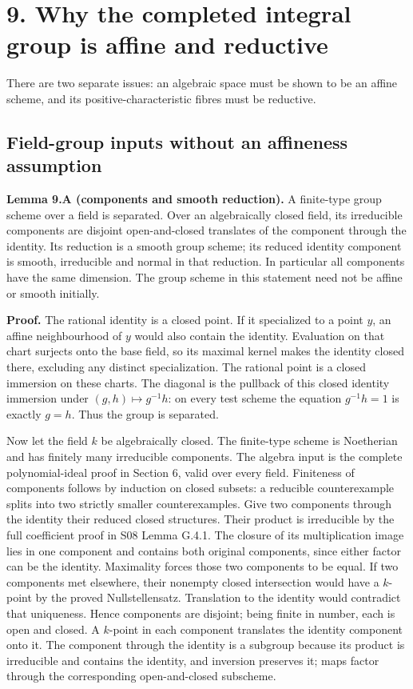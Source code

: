 \documentclass[11pt,a4paper,openany]{report}
\newcounter{none}
\begin{document}
\section{9. Why the completed integral group is affine and reductive}\label{AG-RG-05-why-the-completed-integral-group-is-affine-and-reductive}

There are two separate issues: an algebraic space must be shown to be an affine scheme, and its positive-characteristic fibres must be reductive.

\subsection{Field-group inputs without an affineness assumption}\label{AG-RG-05-field-group-inputs-without-an-affineness-assumption}

\textbf{Lemma 9.A (components and smooth reduction).} A finite-type group scheme over a field is separated. Over an algebraically closed field, its irreducible components are disjoint open-and-closed translates of the component through the identity. Its reduction is a smooth group scheme; its reduced identity component is smooth, irreducible and normal in that reduction. In particular all components have the same dimension. The group scheme in this statement need not be affine or smooth initially.

\textbf{Proof.} The rational identity is a closed point. If it specialized to a point \(y\), an affine neighbourhood of \(y\) would also contain the identity. Evaluation on that chart surjects onto the base field, so its maximal kernel makes the identity closed there, excluding any distinct specialization. The rational point is a closed immersion on these charts. The diagonal is the pullback of this closed identity immersion under \((g,h)\mapsto g^{-1}h\): on every test scheme the equation \(g^{-1}h=1\) is exactly \(g=h\). Thus the group is separated.

Now let the field \(k\) be algebraically closed. The finite-type scheme is Noetherian and has finitely many irreducible components. The algebra input is the complete polynomial-ideal proof in Section 6, valid over every field. Finiteness of components follows by induction on closed subsets: a reducible counterexample splits into two strictly smaller counterexamples. Give two components through the identity their reduced closed structures. Their product is irreducible by the full coefficient proof in S08 Lemma G.4.1. The closure of its multiplication image lies in one component and contains both original components, since either factor can be the identity. Maximality forces those two components to be equal. If two components met elsewhere, their nonempty closed intersection would have a \(k\)-point by the proved Nullstellensatz. Translation to the identity would contradict that uniqueness. Hence components are disjoint; being finite in number, each is open and closed. A \(k\)-point in each component translates the identity component onto it. The component through the identity is a subgroup because its product is irreducible and contains the identity, and inversion preserves it; maps factor through the corresponding open-and-closed subscheme.
\end{document}

